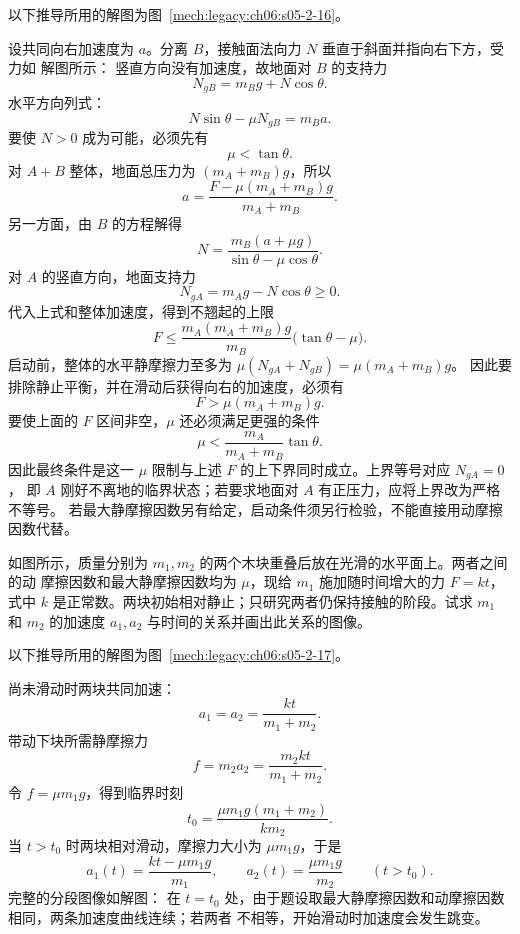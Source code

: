 {\begin{xesolution}
以下推导所用的解图为图~\ref{mech:legacy:ch06:s05-2-16}。

设共同向右加速度为 $a$。分离 $B$，接触面法向力 $N$ 垂直于斜面并指向右下方，受力如
解图所示：
\soldiagTwoSixteen
竖直方向没有加速度，故地面对 $B$ 的支持力
\[
 N_{gB}=m_Bg+N\cos\theta.
\]
水平方向列式：
\[
 N\sin\theta-\mu N_{gB}=m_Ba.
\]
要使 $N>0$ 成为可能，必须先有
\[
 \boxed{\mu<\tan\theta}.
\]
对 $A+B$ 整体，地面总压力为 $(m_A+m_B)g$，所以
\[
 a=\frac{F-\mu(m_A+m_B)g}{m_A+m_B}.
\]
另一方面，由 $B$ 的方程解得
\[
 N=\frac{m_B(a+\mu g)}{\sin\theta-\mu\cos\theta}.
\]
对 $A$ 的竖直方向，地面支持力
\[
 N_{gA}=m_Ag-N\cos\theta\ge0.
\]
代入上式和整体加速度，得到不翘起的上限
\[
 \boxed{F\le
 \frac{m_A(m_A+m_B)g}{m_B}\bigl(\tan\theta-\mu\bigr)}.
\]
启动前，整体的水平静摩擦力至多为 $\mu(N_{gA}+N_{gB})=\mu(m_A+m_B)g$。
因此要排除静止平衡，并在滑动后获得向右的加速度，必须有
\[
 \boxed{F>\mu(m_A+m_B)g}.
\]
要使上面的 $F$ 区间非空，$\mu$ 还必须满足更强的条件
\[
 \boxed{\mu<\frac{m_A}{m_A+m_B}\tan\theta}.
\]
因此最终条件是这一 $\mu$ 限制与上述 $F$ 的上下界同时成立。上界等号对应 $N_{gA}=0$，
即 $A$ 刚好不离地的临界状态；若要求地面对 $A$ 有正压力，应将上界改为严格不等号。
若最大静摩擦因数另有给定，启动条件须另行检验，不能直接用动摩擦因数代替。
\end{xesolution}

\begin{origexamplebox}{}\label{ch06:ex:s05-2-17}
如图所示，质量分别为 $m_1,m_2$ 的两个木块重叠后放在光滑的水平面上。两者之间的动
摩擦因数和最大静摩擦因数均为 $\mu$，现给 $m_1$ 施加随时间增大的力 $F=kt$，式中 $k$
是正常数。两块初始相对静止；只研究两者仍保持接触的阶段。试求
$m_1$ 和 $m_2$ 的加速度 $a_1,a_2$ 与时间的关系并画出此关系的图像。
\probdiagTwoSeventeen
\end{origexamplebox}

\begin{xesolution}
以下推导所用的解图为图~\ref{mech:legacy:ch06:s05-2-17}。

尚未滑动时两块共同加速：
\[
 a_1=a_2=\frac{kt}{m_1+m_2}.
\]
带动下块所需静摩擦力
\[
 f=m_2a_2=\frac{m_2kt}{m_1+m_2}.
\]
令 $f=\mu m_1g$，得到临界时刻
\[
 \boxed{t_0=\frac{\mu m_1g(m_1+m_2)}{km_2}}.
\]
当 $t>t_0$ 时两块相对滑动，摩擦力大小为 $\mu m_1g$，于是
\[
 \boxed{
 a_1(t)=\frac{kt-\mu m_1g}{m_1},
 \qquad
 a_2(t)=\frac{\mu m_1g}{m_2}}
 \qquad(t>t_0).
\]
完整的分段图像如解图：
\soldiagTwoSeventeen
在 $t=t_0$ 处，由于题设取最大静摩擦因数和动摩擦因数相同，两条加速度曲线连续；若两者
不相等，开始滑动时加速度会发生跳变。
\end{xesolution}

}
